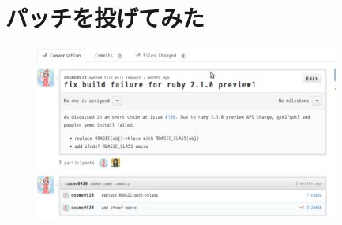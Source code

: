 \section{パッチを投げてみた}

\begin{frame}
\begin{figure}
\begin{center}
  \includegraphics[width=10cm]{img/pull181.pdf}
\end{center}
\end{figure}
\end{frame}
